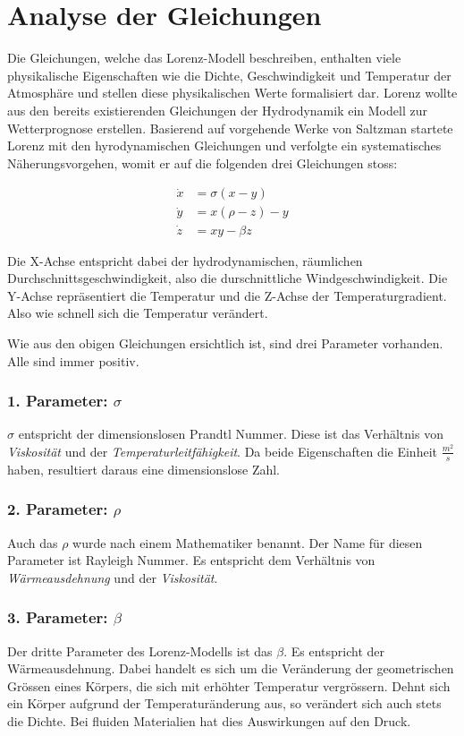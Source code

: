 
\section{Analyse der Gleichungen}
Die Gleichungen, welche das Lorenz-Modell beschreiben, enthalten viele physikalische Eigenschaften wie die Dichte, Geschwindigkeit und Temperatur der Atmosphäre und stellen diese physikalischen Werte formalisiert dar. Lorenz wollte aus den bereits existierenden Gleichungen der Hydrodynamik ein Modell zur Wetterprognose erstellen. Basierend auf vorgehende Werke von Saltzman startete Lorenz mit den hyrodynamischen Gleichungen und verfolgte ein systematisches Näherungsvorgehen, womit er auf die folgenden drei Gleichungen stoss:

\begin{align}
\dot{x} &= \sigma(x - y)\\
\dot{y} &= x(\rho - z) - y\\
\dot{z} &= xy - \beta z
\end{align}

Die X-Achse entspricht dabei der hydrodynamischen, räumlichen Durchschnittsgeschwindigkeit, also die durschnittliche Windgeschwindigkeit. Die Y-Achse repräsentiert die Temperatur und die Z-Achse der Temperaturgradient. Also wie schnell sich die Temperatur verändert. 

Wie aus den obigen Gleichungen ersichtlich ist, sind drei Parameter vorhanden. Alle sind immer positiv.

\subsubsection{1. Parameter: $\sigma$}
$\sigma$ entspricht der dimensionslosen Prandtl Nummer. Diese ist das Verhältnis von \textit{Viskosität} und der \textit{Temperaturleitfähigkeit}. Da beide Eigenschaften die Einheit $\frac{m^2}{s}$ haben, resultiert daraus eine dimensionslose Zahl.

\subsubsection{2. Parameter: $\rho$}
Auch das $\rho$ wurde nach einem Mathematiker benannt. Der Name für diesen Parameter ist Rayleigh Nummer. Es entspricht dem Verhältnis von \textit{Wärmeausdehnung} und der \textit{Viskosität}.

\subsubsection{3. Parameter: $\beta$}
Der dritte Parameter des Lorenz-Modells ist das $\beta$. Es entspricht der Wärmeausdehnung. Dabei handelt es sich um die Veränderung der geometrischen Grössen eines Körpers, die sich mit erhöhter Temperatur vergrössern. Dehnt sich ein Körper aufgrund der Temperaturänderung aus, so verändert sich auch stets die Dichte. Bei fluiden Materialien hat dies Auswirkungen auf den Druck. 

